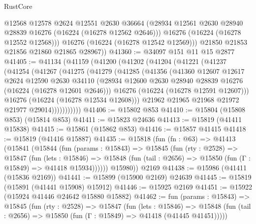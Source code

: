 \begin{lexlean}{RustCore}
\begin{coremodule}
            @12568
            @12578
            @2624
            @12551
            @2630
            @36664
            (@28934 @12561 @2630 @28940 @28839 @16276 (@16224 (@16278 @12562 @2646)))
            @16276
            (@16224 (@16278 @12552 @12568)))
          @16276
          (@16224 (@16278 @12542 @12569)))
        @21850
        @21853
        @21856
        @21860
        @21865
        @28967))
@41360 := @34097 @151 @11 @15 @2877
@41405 := @41134
    (@41159
      (@41200
        (@41202
          (@41204
            (@41221
              (@41237
                (@41254
                  (@41267
                    (@41275
                      (@41279
                        (@41285
                          (@41356
                            (@41360
                              @12607
                              @12617
                              @2624
                              @12590
                              @2630
                              @34110
                              (@28934
                                @12600
                                @2630
                                @28940
                                @28839
                                @16276
                                (@16224 (@16278 @12601 @2646)))
                              @16276
                              (@16224 (@16278 @12591 @12607)))
                            @16276
                            (@16224 (@16278 @12534 @12608)))
                          @21962
                          @21965
                          @21968
                          @21972
                          @21977
                          @29014)))))))))))
@41406 := @15802 @853
@41410 := @15804 (@15808 @853) (@15814 @853)
@41411 := @15823 @24636
@41413 := @15819 (@41411 @15838)
@41415 := @15861 (@15862 @853)
@41416 := @15857 @41415
@41418 := @15819 (@41416 @15887)
@41435 := @15818
    (fun (fn : @63) =>
    @41413
      (@15841
        (@15844
          (fun (params : @15843) =>
          @15845
            (fun (rty : @2528) =>
            @15847
              (fun (lets : @15846) =>
              @15848 (fun (tail : @2656) => @15850 (fun (Γ : @15849) => @41418 @15934))))))
        @15980))
    @2169
@41438 := @15986 (@41411 (@15836 @2169))
@41441 := @15899 (@15900 @2169) @24639
@41445 := @15819 (@15891 (@41441 @15908) @15912)
@41446 := @15925 @2169
@41451 := @15922 (@15924 @41446 @24642 @15880 @15882)
@41462 := fun (params : @15843) =>
  @15845
    (fun (rty : @2528) =>
    @15847
      (fun (lets : @15846) =>
      @15848 (fun (tail : @2656) => @15850 (fun (Γ : @15849) => @41418 (@41445 @41451)))))

\end{coremodule}
\end{lexlean}
